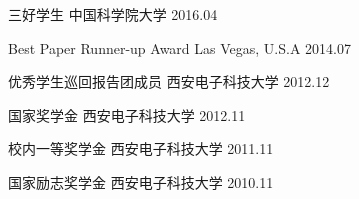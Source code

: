 



\begin{cvhonors}

  \cvhonor
    {三好学生} %
    {} %
    {中国科学院大学} %
    {2016.04} %

  \cvhonor
    {Best Paper Runner-up Award} %
    {} %
    {Las Vegas, U.S.A} %
    {2014.07} %

  \cvhonor
    {优秀学生巡回报告团成员} %
    {} %
    {西安电子科技大学} %
    {2012.12} %

  \cvhonor
    {国家奖学金} %
    {} %
    {西安电子科技大学} %
    {2012.11} %

  \cvhonor
    {校内一等奖学金} %
    {} %
    {西安电子科技大学} %
    {2011.11} %
    
  \cvhonor
    {国家励志奖学金} %
    {} %
    {西安电子科技大学} %
    {2010.11} %

\end{cvhonors}


